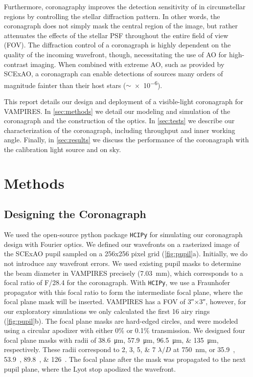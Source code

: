 \documentclass[]{spie}  %
\begin{document}
Furthermore, coronagraphy improves the detection sensitivity of in circumstellar regions by controlling the stellar diffraction pattern. In other words, the coronagraph does not simply mask the central region of the image, but rather attenuates the effects of the stellar PSF throughout the entire field of view (FOV). The diffraction control of a coronagraph is highly dependent on the quality of the incoming wavefront, though, necessitating the use of AO for high-contrast imaging. When combined with extreme AO, such as provided by SCExAO, a coronagraph can enable detections of sources many orders of magnitude fainter than their host stars ($\sim$\num{e-6})\cite{guyon2018}.

This report details our design and deployment of a visible-light coronagraph for VAMPIRES. In \autoref{sec:methods} we detail our modeling and simulation of the coronagraph and the construction of the optics. In \autoref{sec:tests} we describe our characterization of the coronagraph, including throughput and inner working angle. Finally, in \autoref{sec:results} we discuss the performance of the coronagraph with the calibration light source and on sky.

\section{Methods}\label{sec:methods}

\subsection{Designing the Coronagraph}\label{sec:design}

We used the open-source python package \texttt{HCIPy}\cite{por2018} for simulating our coronagraph design with Fourier optics. We defined our wavefronts on a rasterized image of the SCExAO pupil sampled on a 256x256 pixel grid (\autoref{fig:pupil}a). Initially, we do not introduce any wavefront errors. We used existing pupil masks to determine the beam diameter in VAMPIRES precisely (\qty{7.03}{\milli\meter}), which corresponds to a focal ratio of F/28.4 for the coronagraph. With \texttt{HCIPy}, we use a Fraunhofer propagator with this focal ratio to form the intermediate focal plane, where the focal plane mask will be inserted. VAMPIRES has a FOV of \ang{;;3}$\times$\ang{;;3}, however, for our exploratory simulations we only calculated the first 16 airy rings (\autoref{fig:pupil}b). The focal plane masks are hard-edged circles, and were modeled using a circular apodizer with either 0\% or 0.1\% transmission. We designed four focal plane masks with radii of \qtylist{38.6;57.9;96.5;135}{\micro\meter}, respectively. These radii correspond to \numlist{2;3;5;7} $\lambda/D$ at \qty{750}{\nano\meter}, or \qtylist{35.9;53.9;89.8;126}{\milliarcsecond}. The focal plane after the mask was propagated to the next pupil plane, where the Lyot stop apodized the wavefront.
\end{document}

